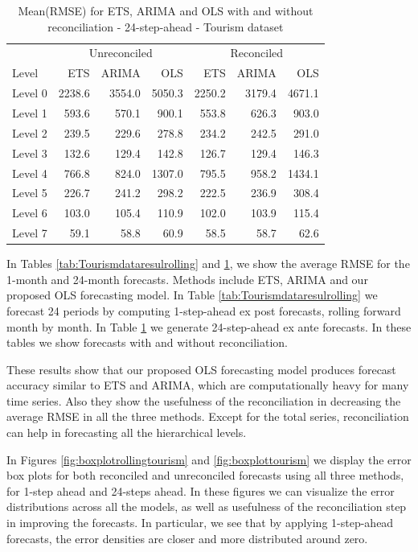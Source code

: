 \documentclass[11pt,a4paper,]{article}
\begin{document}
\begin{table}[t]

\caption{\label{tab:TourismdataresultRMSE}Mean(RMSE) for ETS, ARIMA and OLS with and without reconciliation - 24-step-ahead - Tourism dataset}
\centering
\begin{tabular}{lrrrrrr}
\toprule
\multicolumn{1}{c}{} & \multicolumn{3}{c}{Unreconciled} & \multicolumn{3}{c}{Reconciled} \\
\cmidrule(l{3pt}r{3pt}){2-4} \cmidrule(l{3pt}r{3pt}){5-7}
Level & ETS & ARIMA & OLS & ETS & ARIMA & OLS\\
\midrule
Level 0 & 2238.6 & 3554.0 & 5050.3 & 2250.2 & 3179.4 & 4671.1\\
Level 1 & 593.6 & 570.1 & 900.1 & 553.8 & 626.3 & 903.0\\
Level 2 & 239.5 & 229.6 & 278.8 & 234.2 & 242.5 & 291.0\\
Level 3 & 132.6 & 129.4 & 142.8 & 126.7 & 129.4 & 146.3\\
Level 4 & 766.8 & 824.0 & 1307.0 & 795.5 & 958.2 & 1434.1\\
Level 5 & 226.7 & 241.2 & 298.2 & 222.5 & 236.9 & 308.4\\
Level 6 & 103.0 & 105.4 & 110.9 & 102.0 & 103.9 & 115.4\\
Level 7 & 59.1 & 58.8 & 60.9 & 58.5 & 58.7 & 62.6\\
\bottomrule
\end{tabular}
\end{table}

In Tables \ref{tab:Tourismdataresulrolling} and \ref{tab:TourismdataresultRMSE}, we show the average RMSE for the 1-month and 24-month forecasts. Methods include ETS, ARIMA and our proposed OLS forecasting model. In Table \ref{tab:Tourismdataresulrolling} we forecast 24 periods by computing 1-step-ahead ex post forecasts, rolling forward month by month. In Table \ref{tab:TourismdataresultRMSE} we generate 24-step-ahead ex ante forecasts. In these tables we show forecasts with and without reconciliation.

These results show that our proposed OLS forecasting model produces forecast accuracy similar to ETS and ARIMA, which are computationally heavy for many time series. Also they show the usefulness of the reconciliation in decreasing the average RMSE in all the three methods. Except for the total series, reconciliation can help in forecasting all the hierarchical levels.

In Figures \ref{fig:boxplotrollingtourism} and \ref{fig:boxplottourism} we display the error box plots for both reconciled and unreconciled forecasts using all three methods, for 1-step ahead and 24-steps ahead. In these figures we can visualize the error distributions across all the models, as well as usefulness of the reconciliation step in improving the forecasts. In particular, we see that by applying 1-step-ahead forecasts, the error densities are closer and more distributed around zero.
\end{document}
